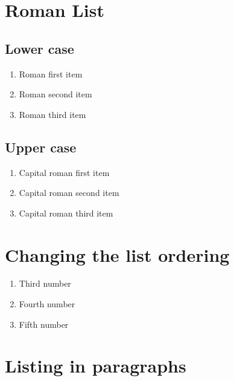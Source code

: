 \documentclass{article}
\begin{document}
\section{Roman List}

\subsection{Lower case}
\begin{enumerate}[label=\roman*.]
    \item Roman first item
    \item Roman second item
    \item Roman third item
\end{enumerate}

\subsection{Upper case}
\begin{enumerate}[label=\Roman*.]
    \item Capital roman first item
    \item Capital roman second item
    \item Capital roman third item
\end{enumerate}

\section{Changing the list ordering}
\begin{enumerate}[start=3]
    \item Third number
    \item Fourth number
    \item Fifth number
\end{enumerate}

\section{Listing in paragraphs}
\end{document}
